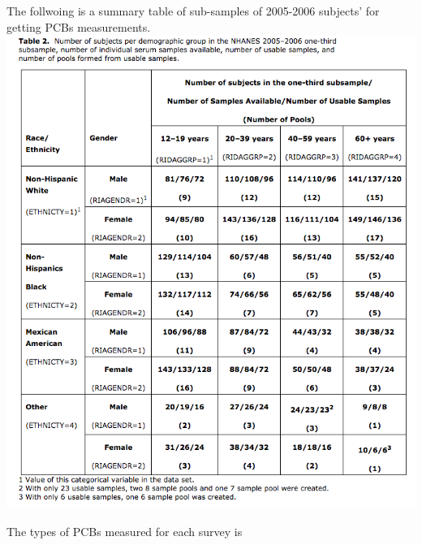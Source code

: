 \documentclass[]{article}
\begin{document}
The follwoing is a summary table of sub-samples of 2005-2006 subjects'
for getting PCBs measurements.
\includegraphics{./figs/subsampling_2005.png}

The types of PCBs measured for each survey is
\end{document}

